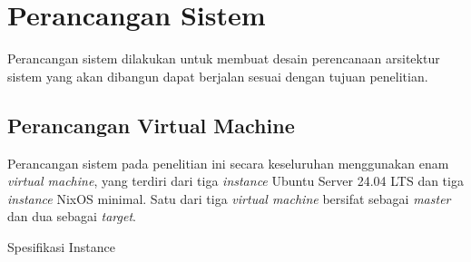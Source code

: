 \documentclass[10pt,twoside]{report}
\begin{document}
\section{Perancangan Sistem}
\vspace{-3mm}
\begin{adjustwidth}{20pt}{}
	Perancangan sistem dilakukan untuk membuat desain perencanaan arsitektur
	sistem yang akan dibangun dapat berjalan sesuai dengan tujuan penelitian.
	\subsection{Perancangan Virtual Machine}
	\begin{adjustwidth}{20pt}{}
		Perancangan sistem pada penelitian ini secara keseluruhan menggunakan enam
		\textit{virtual machine}, yang terdiri dari tiga \textit{instance} Ubuntu
		Server 24.04 LTS dan tiga \textit{instance} NixOS minimal.
		Satu dari tiga \textit{virtual machine} bersifat sebagai \textit{master}
		dan dua sebagai \textit{target}.
	\end{adjustwidth}
	\begin{table}[!htbp]
		\caption{Spesifikasi Instance}
		\begin{center}


\end{center}
\end{table}
\end{adjustwidth}
\end{document}
